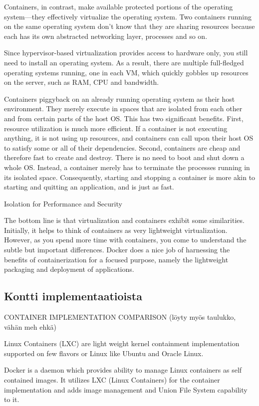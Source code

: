 \documentclass[finnish]{tktltiki2}
\theoremstyle{definition}
\theoremstyle{remark}
\begin{document}
Containers, in contrast, make available protected portions of the operating system—they effectively virtualize the operating system. Two containers running on the same operating system don't know that they are sharing resources because each has its own abstracted networking layer, processes and so on. \cite{docker}

Since hypervisor-based virtualization provides access to hardware only, you still need to install an operating system. As a result, there are multiple full-fledged operating systems running, one in each VM, which quickly gobbles up resources on the server, such as RAM, CPU and bandwidth.

Containers piggyback on an already running operating system as their host environment. They merely execute in spaces that are isolated from each other and from certain parts of the host OS. This has two significant benefits. First, resource utilization is much more efficient. If a container is not executing anything, it is not using up resources, and containers can call upon their host OS to satisfy some or all of their dependencies. Second, containers are cheap and therefore fast to create and destroy. There is no need to boot and shut down a whole OS. Instead, a container merely has to terminate the processes running in its isolated space. Consequently, starting and stopping a container is more akin to starting and quitting an application, and is just as fast.

Isolation for Performance and Security

The bottom line is that virtualization and containers exhibit some similarities. Initially, it helps to think of containers as very lightweight virtualization. However, as you spend more time with containers, you come to understand the subtle but important differences. Docker does a nice job of harnessing the benefits of containerization for a focused purpose, namely the lightweight packaging and deployment of applications.

\subsection{Kontti implementaatioista}

CONTAINER IMPLEMENTATION COMPARISON (löyty myös taulukko, vähän meh ehkä)

Linux Containers (LXC) are light weight kernel containment implementation supported on few flavors or Linux like
Ubuntu and Oracle Linux.

Docker is a daemon which provides ability to manage Linux containers as self contained images. It utilizes LXC (Linux Containers) for the container implementation and adds image management and Union File System capability to it.
\end{document}
